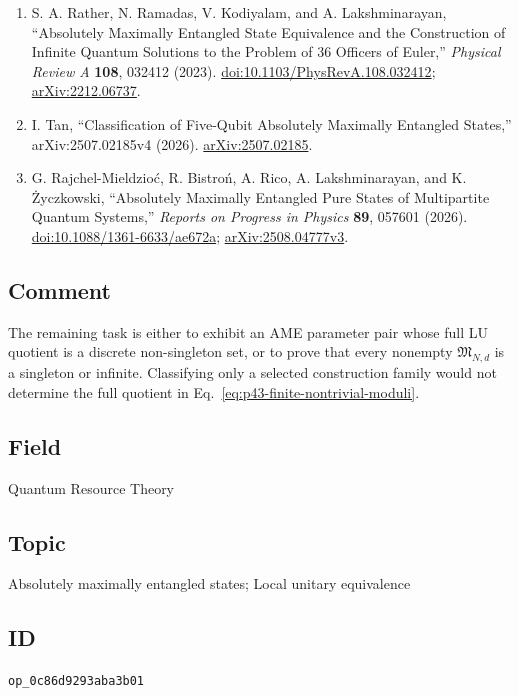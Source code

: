 \begin{enumerate}[label={},leftmargin=4.8em,labelsep=0.5em]
  \footnotesize
  \item[\textup{[RRKL23]}]\label{ref:p43-rather}
  S. A. Rather, N. Ramadas, V. Kodiyalam, and A. Lakshminarayan,
  ``Absolutely Maximally Entangled State Equivalence and the Construction of
  Infinite Quantum Solutions to the Problem of 36 Officers of Euler,''
  \emph{Physical Review A} \textbf{108}, 032412 (2023).
  \href{https://doi.org/10.1103/PhysRevA.108.032412}{doi:10.1103/PhysRevA.108.032412};
  \href{https://arxiv.org/abs/2212.06737}{arXiv:2212.06737}.

  \item[\textup{[Tan26]}]\label{ref:p43-tan}
  I. Tan, ``Classification of Five-Qubit Absolutely Maximally Entangled
  States,'' arXiv:2507.02185v4 (2026).
  \href{https://arxiv.org/abs/2507.02185}{arXiv:2507.02185}.

  \item[\textup{[RBR+26]}]\label{ref:p43-review}
  G. Rajchel-Mieldzio{\'c}, R. Bistro{\'n}, A. Rico, A. Lakshminarayan, and
  K. {\.{Z}}yczkowski, ``Absolutely Maximally Entangled Pure States of
  Multipartite Quantum Systems,'' \emph{Reports on Progress in Physics}
  \textbf{89}, 057601 (2026).
  \href{https://doi.org/10.1088/1361-6633/ae672a}{doi:10.1088/1361-6633/ae672a};
  \href{https://arxiv.org/abs/2508.04777}{arXiv:2508.04777v3}.
\end{enumerate}

\subsection*{Comment}

The remaining task is either to exhibit an AME parameter pair whose full LU
quotient is a discrete non-singleton set, or to prove that every nonempty
$\mathfrak{M}_{N,d}$ is a singleton or infinite.  Classifying only a selected
construction family would not determine the full quotient in
Eq.~\eqref{eq:p43-finite-nontrivial-moduli}.

\subsection*{Field}

Quantum Resource Theory

\subsection*{Topic}

Absolutely maximally entangled states; Local unitary equivalence

\subsection*{ID}

\texttt{op\_0c86d9293aba3b01}
